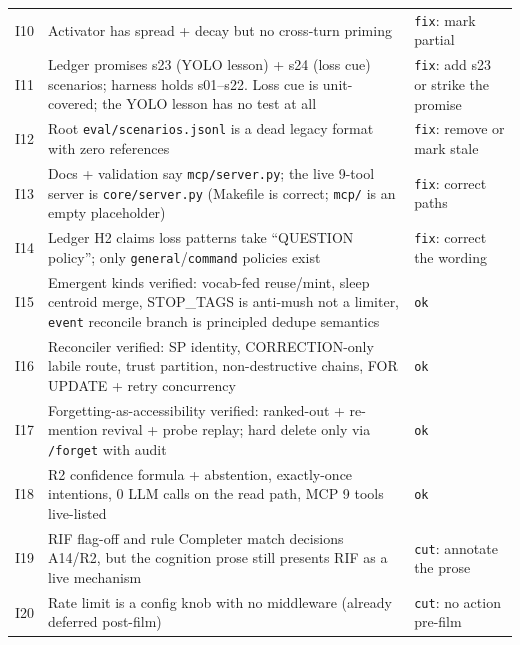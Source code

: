 \begin{longtable}{@{}p{}p{}p{}@{}}
I10 & Activator has spread + decay but no cross-turn priming &
\texttt{fix}: mark partial \\
I11 & Ledger promises s23 (YOLO lesson) + s24 (loss cue) scenarios;
harness holds s01--s22. Loss cue is unit-covered; the YOLO lesson has no
test at all & \texttt{fix}: add s23 or strike the promise \\
I12 & Root \texttt{eval/scenarios.jsonl} is a dead legacy format with zero
references & \texttt{fix}: remove or mark stale \\
I13 & Docs + validation say \texttt{mcp/server.py}; the live 9-tool server
is \texttt{core/server.py} (Makefile is correct; \texttt{mcp/} is an empty
placeholder) & \texttt{fix}: correct paths \\
I14 & Ledger H2 claims loss patterns take ``QUESTION policy''; only
\texttt{general}/\texttt{command} policies exist & \texttt{fix}: correct
the wording \\
I15 & Emergent kinds verified: vocab-fed reuse/mint, sleep centroid merge,
STOP\_TAGS is anti-mush not a limiter, \texttt{event} reconcile branch is
principled dedupe semantics & \texttt{ok} \\
I16 & Reconciler verified: SP identity, CORRECTION-only labile route,
trust partition, non-destructive chains, FOR UPDATE + retry concurrency &
\texttt{ok} \\
I17 & Forgetting-as-accessibility verified: ranked-out + re-mention
revival + probe replay; hard delete only via \texttt{/forget} with audit &
\texttt{ok} \\
I18 & R2 confidence formula + abstention, exactly-once intentions, 0 LLM
calls on the read path, MCP 9 tools live-listed & \texttt{ok} \\
I19 & RIF flag-off and rule Completer match decisions A14/R2, but the
cognition prose still presents RIF as a live mechanism & \texttt{cut}:
annotate the prose \\
I20 & Rate limit is a config knob with no middleware (already deferred
post-film) & \texttt{cut}: no action pre-film \\
\bottomrule
\end{longtable}

